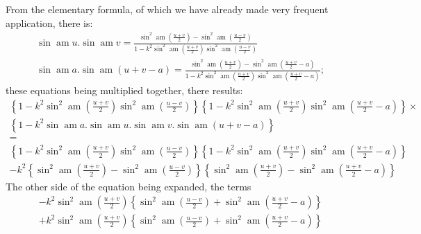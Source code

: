 \documentclass{article}
\begin{document}
From the elementary formula, of which we have already made very frequent application, there is:
\[
\begin{gathered}
\sin\operatorname{am}u.\sin\operatorname{am}v=\frac{\sin^{2}\operatorname{am}\left(\frac{u+v}{2}\right)-\sin^{2}\operatorname{am}\left(\frac{u-v}{2}\right)}{1-k^{2}\sin^{2}\operatorname{am}\left(\frac{u+v}{2}\right)\sin^{2}\operatorname{am}\left(\frac{u-v}{2}\right)}\\[1.5ex]
\sin\operatorname{am}a.\sin\operatorname{am}(u+v-a)=\frac{\sin^{2}\operatorname{am}\left(\frac{u+v}{2}\right)-\sin^{2}\operatorname{am}\left(\frac{u+v}{2}-a\right)}{1-k^{2}\sin^{2}\operatorname{am}\left(\frac{u+v}{2}\right)\sin^{2}\operatorname{am}\left(\frac{u+v}{2}-a\right)};
\end{gathered}
\]
these equations being multiplied together, there results:
\[
\begin{gathered}
\left\{1-k^{2}\sin^{2}\operatorname{am}\left(\frac{u+v}{2}\right)\sin^{2}\operatorname{am}\left(\frac{u-v}{2}\right)\right\}\left\{1-k^{2}\sin^{2}\operatorname{am}\left(\frac{u+v}{2}\right)\sin^{2}\operatorname{am}\left(\frac{u+v}{2}-a\right)\right\}\times\\[1.5ex]
\left\{1-k^{2}\sin\operatorname{am}a.\sin\operatorname{am}u.\sin\operatorname{am}v.\sin\operatorname{am}(u+v-a)\right\}\\[1.5ex]
=\\[1.5ex]
\left\{1-k^{2}\sin^{2}\operatorname{am}\left(\frac{u+v}{2}\right)\sin^{2}\operatorname{am}\left(\frac{u-v}{2}\right)\right\}\left\{1-k^{2}\sin^{2}\operatorname{am}\left(\frac{u+v}{2}\right)\sin^{2}\operatorname{am}\left(\frac{u+v}{2}-a\right)\right\}\\[1.5ex]
-k^{2}\left\{\sin^{2}\operatorname{am}\left(\frac{u+v}{2}\right)-\sin^{2}\operatorname{am}\left(\frac{u-v}{2}\right)\right\}\left\{\sin^{2}\operatorname{am}\left(\frac{u+v}{2}\right)-\sin^{2}\operatorname{am}\left(\frac{u+v}{2}-a\right)\right\}
\end{gathered}
\]
The other side of the equation being expanded, the terms
\[
\begin{gathered}
-k^{2}\sin^{2}\operatorname{am}\left(\frac{u+v}{2}\right)\left\{\sin^{2}\operatorname{am}\left(\frac{u-v}{2}\right)+\sin^{2}\operatorname{am}\left(\frac{u+v}{2}-a\right)\right\}\\[1.5ex]
+k^{2}\sin^{2}\operatorname{am}\left(\frac{u+v}{2}\right)\left\{\sin^{2}\operatorname{am}\left(\frac{u-v}{2}\right)+\sin^{2}\operatorname{am}\left(\frac{u+v}{2}-a\right)\right\}
\end{gathered}
\]
\end{document}
